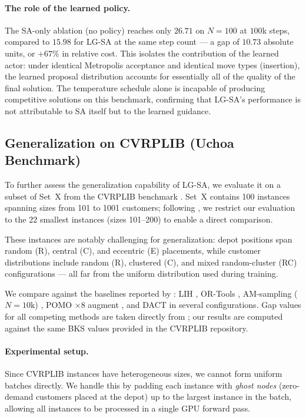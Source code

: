 \documentclass[letterpaper]{article} %
\begin{document}
\paragraph{The role of the learned policy.}
The SA-only ablation (no policy) reaches only $26.71$ on $N{=}100$ at $100$k steps, compared to $15.98$ for LG-SA at the same step count --- a gap of $10.73$ absolute units, or $+67\%$ in relative cost. This isolates the contribution of the learned actor: under identical Metropolis acceptance and identical move types (insertion), the learned proposal distribution accounts for essentially all of the quality of the final solution. The temperature schedule alone is incapable of producing competitive solutions on this benchmark, confirming that LG-SA's performance is not attributable to SA itself but to the learned guidance.

\subsection{Generalization on CVRPLIB (Uchoa Benchmark)}
\label{sec:uchoa_generalization}

To further assess the generalization capability of LG-SA, we evaluate it on a subset of Set~X from the CVRPLIB benchmark \citep{uchoa_new_2017}. Set~X contains 100 instances spanning sizes from 101 to 1001 customers; following \citet{ma_learning_2021}, we restrict our evaluation to the 22 smallest instances (sizes 101–200) to enable a direct comparison.

These instances are notably challenging for generalization: depot positions span random (R), central (C), and eccentric (E) placements, while customer distributions include random (R), clustered (C), and mixed random-cluster (RC) configurations — all far from the uniform distribution used during training.

We compare against the baselines reported by \citet{ma_learning_2021}: LIH \citep{wu_learning_2022}, OR-Tools \citep{ortools_routing}, AM-sampling ($N{=}10\text{k}$) \citep{kool_attention_2019}, POMO $\times$8 augment \citep{kwon_pomo_2021}, and DACT \citep{ma_learning_2021} in several configurations.
Gap values for all competing methods are taken directly from \citet{ma_learning_2021}; our results are computed against the same BKS values provided in the CVRPLIB repository.

\paragraph{Experimental setup.}
Since CVRPLIB instances have heterogeneous sizes, we cannot form uniform batches directly.
We handle this by padding each instance with \emph{ghost nodes} (zero-demand customers placed at the depot) up to the largest instance in the batch, allowing all instances to be processed in a single GPU forward pass.
\end{document}
